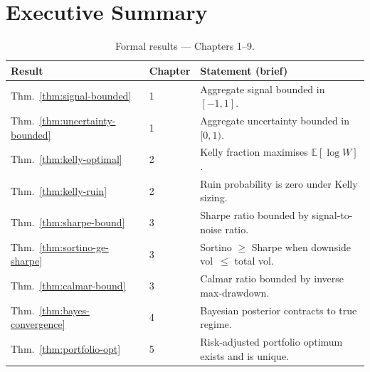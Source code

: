 \documentclass[12pt,openany]{book}
\numberwithin{equation}{chapter}
\theoremstyle{plain}
\theoremstyle{definition}
\theoremstyle{remark}
\newenvironment{executivesummary}{%
  \chapter*{Executive Summary}
}{%
}
\numberwithin{equation}{chapter}
\theoremstyle{plain}
\begin{document}
\begin{executivesummary}
\begin{table}[H]
  \centering
  \caption{Formal results --- Chapters 1--9.}
  \label{tab:exec-thm-A}
  \begin{tabularx}{\linewidth}{@{} l l X @{}}
    \toprule
    \textbf{Result} & \textbf{Chapter} & \textbf{Statement (brief)} \\
    \midrule
    Thm.~\ref{thm:signal-bounded}   & 1 & Aggregate signal bounded in $[-1,1]$. \\
    Thm.~\ref{thm:uncertainty-bounded} & 1 & Aggregate uncertainty bounded in $[0,1)$. \\
    Thm.~\ref{thm:kelly-optimal}    & 2 & Kelly fraction maximises $\mathbb{E}[\log W]$. \\
    Thm.~\ref{thm:kelly-ruin}       & 2 & Ruin probability is zero under Kelly sizing. \\
    Thm.~\ref{thm:sharpe-bound}     & 3 & Sharpe ratio bounded by signal-to-noise ratio. \\
    Thm.~\ref{thm:sortino-ge-sharpe}& 3 & Sortino $\ge$ Sharpe when downside vol\ $\le$ total vol. \\
    Thm.~\ref{thm:calmar-bound}     & 3 & Calmar ratio bounded by inverse max-drawdown. \\
    Thm.~\ref{thm:bayes-convergence}& 4 & Bayesian posterior contracts to true regime. \\
    Thm.~\ref{thm:portfolio-opt}    & 5 & Risk-adjusted portfolio optimum exists and is unique. \\
    \bottomrule
  \end{tabularx}
\end{table}


\end{executivesummary}
\end{document}
